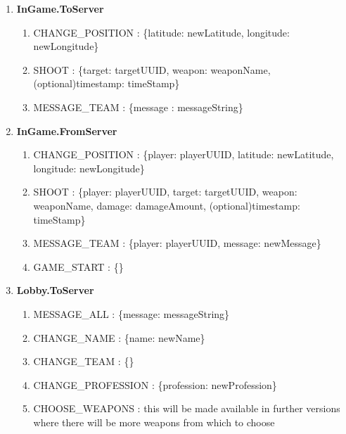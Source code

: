 \begin{enumerate}
  \item \textbf{InGame.ToServer}  
  \begin{enumerate}
    \item CHANGE\_POSITION :
    \{latitude: newLatitude, longitude: newLongitude\}
    
    \item SHOOT :
    \{target: targetUUID, weapon: weaponName, (optional)timestamp: timeStamp\}
        
    \item MESSAGE\_TEAM :
    \{message : messageString\}
      
  \end{enumerate}  
  
  \item \textbf{InGame.FromServer}  
  \begin{enumerate}
    \item CHANGE\_POSITION :
    \{player: playerUUID, latitude: newLatitude, longitude: newLongitude\}
    
    \item SHOOT :
    \{player: playerUUID, target: targetUUID, weapon: weaponName, damage:    
    damageAmount, (optional)timestamp: timeStamp\}
    
    \item MESSAGE\_TEAM :
    \{player: playerUUID, message: newMessage\}
    
    \item GAME\_START :
    \{\} 
        
  \end{enumerate}  
  
  \item \textbf{Lobby.ToServer}
  
  \begin{enumerate}
    
    \item MESSAGE\_ALL :
    \{message: messageString\}
    
	\item CHANGE\_NAME :
	\{name: newName\}
			
	\item CHANGE\_TEAM :
	\{\}		
	
	\item CHANGE\_PROFESSION :
	\{profession: newProfession\}
	
	\item CHOOSE\_WEAPONS :
	this will be made available in further versions where there will be more
	weapons from which to choose
	

\end{enumerate}
\end{enumerate}
